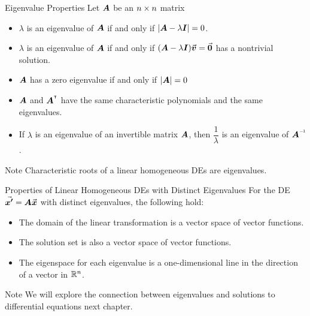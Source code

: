 \documentclass{beamer}
\begin{document}
\begin{frame}
\begin{block}{Eigenvalue Properties}
Let $\boldsymbol{A}$ be an $n\times n$ matrix
\begin{itemize}[<+- | alert@+>]
\item $\lambda$ is an eigenvalue of $\boldsymbol{A}$ if and only if ${\left\lvert \boldsymbol{A}-\lambda\boldsymbol{I}\right\rvert}=0$.
\item $\lambda$ is an eigenvalue of $\boldsymbol{A}$ if and only if $(\boldsymbol{A}-\lambda\boldsymbol{I}){\vec{\boldsymbol{v}}}={\vec{\boldsymbol{0}}}$ has a nontrivial solution.
\item $\boldsymbol{A}$ has a zero eigenvalue if and only if ${\left\lvert \boldsymbol{A}\right\rvert}=0$
\item $\boldsymbol{A}$ and $\transposeof{\mat{A}}$ have the same characteristic polynomials and the same eigenvalues.
\item If $\lambda$ is an eigenvalue of an invertible matrix $\boldsymbol{A}$, then $\dfrac{1}{\lambda}$ is an eigenvalue of $\inverseof{\mat{A}}$.
\end{itemize}
\end{block}
\end{frame}

\begin{frame}
\onslide<+->
\begin{block}{Note}
Characteristic roots of a linear homogeneous DEs are eigenvalues.
\end{block}
\onslide<+->
\begin{block}{Properties of Linear Homogeneous DEs with Distinct Eigenvalues}
For the DE ${\vec{\boldsymbol{x^\prime}}}=\boldsymbol{A}{\vec{\boldsymbol{x}}}$ with distinct eigenvalues, the following hold:
\begin{itemize}[<+- | alert@+>]
\item The domain of the linear transformation is a vector space of vector functions.
\item The solution set is also a vector space of vector functions.
\item The eigenspace for each eigenvalue is a one-dimensional line in the direction of a vector in $\mathbb{R}^n$.
\end{itemize}
\end{block}
\onslide<+->
\begin{block}{Note}
We will explore the connection between eigenvalues and solutions to differential equations next chapter.
\end{block}
\end{frame}
\end{document}
